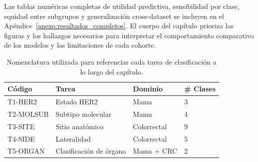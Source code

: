 Las tablas numéricas completas de utilidad predictiva, sensibilidad por clase, equidad entre subgrupos y generalización cross-dataset se incluyen en el Apéndice~\ref{anexo:resultados_completos}. El cuerpo del capítulo prioriza las figuras y los hallazgos necesarios para interpretar el comportamiento comparativo de los modelos y las limitaciones de cada cohorte.

\begin{table}[htbp]
\centering
\caption{Nomenclatura utilizada para referenciar cada tarea de clasificación a lo largo del capítulo.}
\label{tab:nomenclatura_tareas}
\begin{tabular}{l l l l}
\toprule
\textbf{Código} & \textbf{Tarea} & \textbf{Dominio} & \textbf{\# Clases} \\
\midrule
T1-HER2   & Estado HER2               & Mama         & 3 \\
T2-MOLSUB & Subtipo molecular         & Mama         & 4 \\
T3-SITE   & Sitio anatómico           & Colorrectal  & 9 \\
T4-SIDE   & Lateralidad               & Colorrectal  & 5 \\
T5-ORGAN  & Clasificación de órgano   & Mama + CRC   & 2 \\
\bottomrule
\end{tabular}
\end{table}


